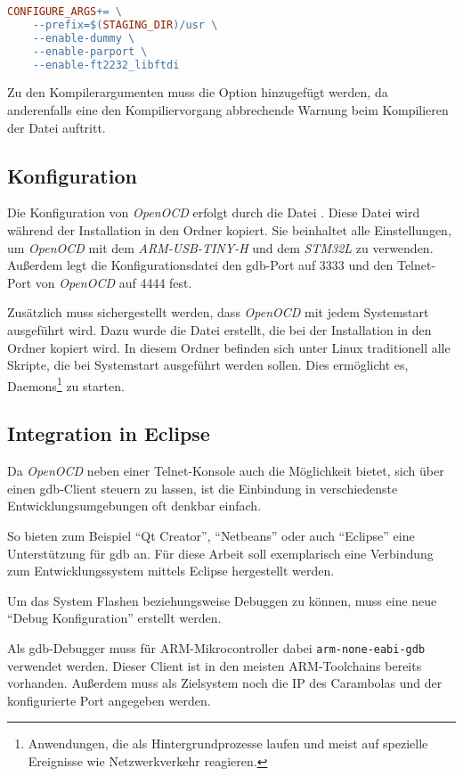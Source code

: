 \begin{lstlisting}[language=make]
CONFIGURE_ARGS+= \
	--prefix=$(STAGING_DIR)/usr \
	--enable-dummy \
	--enable-parport \
	--enable-ft2232_libftdi
\end{lstlisting}

Zu den Kompilerargumenten muss die Option
 hinzugefügt werden, da anderenfalls
eine den Kompiliervorgang abbrechende Warnung beim Kompilieren der Datei
 auftritt.
\subsection{Konfiguration}
Die Konfiguration von \emph{OpenOCD} erfolgt durch die Datei .
Diese Datei wird während der Installation in den Ordner
\listinlsh{/etc/} kopiert. Sie beinhaltet alle Einstellungen, um \emph{OpenOCD}
mit dem \emph{ARM-USB-TINY-H} und dem \emph{STM32L} zu verwenden. Außerdem legt die
Konfigurationsdatei den \gls{gdb}-Port auf 3333 und den Telnet-Port von \emph{OpenOCD}
auf 4444 fest.

Zusätzlich muss sichergestellt werden, dass \emph{OpenOCD} mit jedem Systemstart
ausgeführt wird. Dazu wurde die Datei \listinlsh{openocd.init} erstellt, die
bei der Installation in den Ordner  kopiert wird.
In diesem Ordner befinden sich unter Linux traditionell alle Skripte, die bei
Systemstart ausgeführt werden sollen. Dies ermöglicht es,
Daemons\footnote{Anwendungen, die als Hintergrundprozesse laufen und meist auf
spezielle Ereignisse wie Netzwerkverkehr reagieren.} zu starten.
\subsection{Integration in Eclipse}\label{subs:eclipse}
Da \emph{OpenOCD} neben einer Telnet-Konsole auch die Möglichkeit bietet, sich über
einen \gls{gdb}-Client steuern zu lassen, ist die Einbindung in verschiedenste
Entwicklungsumgebungen oft denkbar einfach.

So bieten zum Beispiel "`Qt Creator"', "`Netbeans"' oder auch "`Eclipse"' eine
Unterstützung für \gls{gdb} an. Für diese Arbeit soll exemplarisch eine
Verbindung zum Entwicklungssystem mittels Eclipse hergestellt werden.

Um das System Flashen beziehungsweise Debuggen zu können, muss eine neue "`Debug
Konfiguration"' erstellt werden.

Als \gls{gdb}-Debugger muss für ARM-Mikrocontroller dabei
\texttt{arm-none-eabi-gdb} verwendet werden. Dieser Client ist in den meisten
ARM-Toolchains bereits vorhanden. Außerdem muss als Zielsystem noch die IP des
Carambolas und der konfigurierte Port angegeben werden.

